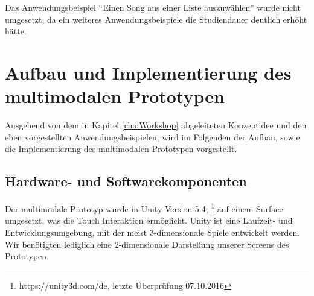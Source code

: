 Das Anwendungsbeispiel "`Einen Song aus einer Liste auszuwählen"' wurde nicht umgesetzt, da ein weiteres  Anwendungsbeispiele die Studiendauer deutlich erhöht hätte. 
\section[Aufbau und Implementierung]{Aufbau und Implementierung des multimodalen Prototypen}
Ausgehend von dem in Kapitel \ref{cha:Workshop} abgeleiteten Konzeptidee und den eben vorgestellten Anwendungsbeispielen, wird im Folgenden der Aufbau, sowie die Implementierung des multimodalen Prototypen vorgestellt.
\subsection{Hardware- und Softwarekomponenten}
Der multimodale Prototyp wurde in Unity Version 5.4, \footnote{https://unity3d.com/de, letzte Überprüfung 07.10.2016} auf einem Surface umgesetzt, was die Touch Interaktion ermöglicht. Unity ist eine Laufzeit- und Entwicklungsumgebung, mit der meist 3-dimensionale Spiele entwickelt werden. Wir benötigten lediglich eine 2-dimensionale Darstellung unserer Screens des Prototypen.

